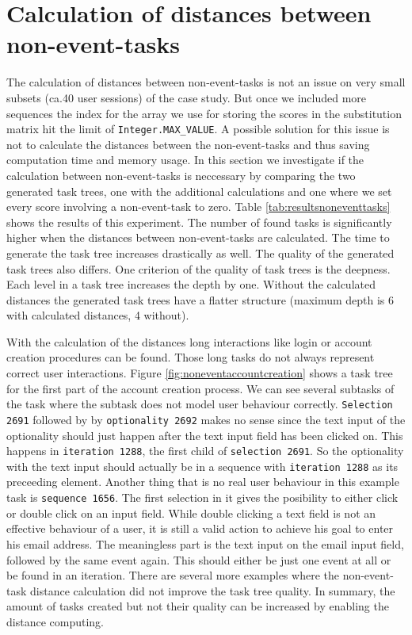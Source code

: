 \section{Calculation of distances between non-event-tasks}
\label{sec:noneventtasks}
The calculation of distances between non-event-tasks is not an issue on very small subsets (ca.40 user sessions) of the case study.
But once we included more sequences the index for the array we use for storing the scores in the substitution matrix hit the limit of \texttt{Integer.MAX\_VALUE}.
A possible solution for this issue is not to calculate the distances between the non-event-tasks and thus saving computation time and memory usage.
In this section we investigate if the calculation between non-event-tasks is neccessary by comparing the two generated task trees, one with the additional calculations and one where
we set every score involving a non-event-task to zero. Table \ref{tab:resultsnoneventtasks} shows the results of this experiment.
The number of found tasks is significantly higher when the distances between non-event-tasks are calculated.
The time to generate the task tree increases drastically as well.
The quality of the generated task trees also differs.
One criterion of the quality of task trees is the deepness. Each level in a task tree increases the depth by one.
Without the calculated distances the generated task trees have a flatter structure (maximum depth is 6 with calculated distances, 4 without).

With the calculation of the distances long interactions like login or account creation procedures can be found.
Those long tasks do not always represent correct user interactions.
Figure \ref{fig:noneventaccountcreation} shows a task tree for the first part of the account creation process.
We can see several subtasks of the task where the subtask does not model user behaviour correctly.
\texttt{Selection 2691} followed by by \texttt{optionality 2692} makes no sense since the text input of the optionality should just happen after the text input field has been clicked on.
This happens in \texttt{iteration 1288}, the first child of \texttt{selection 2691}. So the optionality with the text input should actually be in a sequence with \texttt{iteration 1288} as its preceeding element.
Another thing that is no real user behaviour in this example task is \texttt{sequence 1656}.
The first selection in it gives the posibility to either click or double click on an input field.
While double clicking a text field is not an effective behaviour of a user, it is still a valid action to achieve his goal to enter his email address.
The meaningless part is the text input on the email input field, followed by the same event again. This should either be just one event at all or be found in an iteration.
There are several more examples where the non-event-task distance calculation did not improve the task tree quality.
In summary, the amount of tasks created  but not their quality can be increased by enabling the distance computing.

